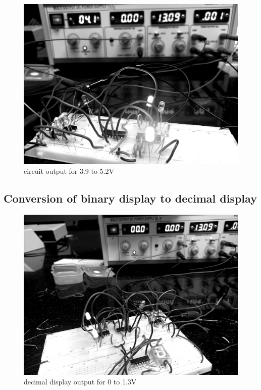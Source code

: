 				\begin{figure}[H]
					\centering
					\label{photo:4}
					\includegraphics[width=0.6\columnwidth]{images/_41.png}
					\caption{circuit output for 3.9 to 5.2V}
				\end{figure}

	\subsection{Conversion of binary display to decimal display}
		\begin{figure}[H]
			\centering
			\label{photo:5}
			\includegraphics[width=0.6\columnwidth]{images/_0.png}
			\caption{ decimal display output for 0 to 1.3V}
		\end{figure}


